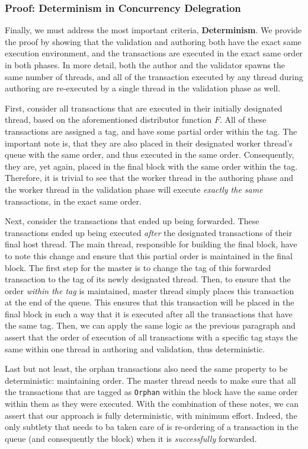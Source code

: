 \subsubsection{Proof: Determinism in Concurrency Delegration}

Finally, we must address the most important criteria, \textbf{Determinism}. We provide the proof by
showing that the validation and authoring both have the exact same execution environment, and the
transactions are executed in the exact same order in both phases. In more detail, both the author
and the validator spawns the same number of threads, and all of the transaction executed by any
thread during authoring are re-executed by a single thread in the validation phase as well.

First, consider all transactions that are executed in their initially designated thread, based on
the aforementioned distributor function $F$. All of these transactions are assigned a tag, and have
some partial order within the tag. The important note is, that they are also placed in their
designated worker thread's queue with the same order, and thus executed in the same order.
Consequently, they are, yet again, placed in the final block with the same order within the tag.
Therefore, it is trivial to see that the worker thread in the authoring phase and the worker thread
in the validation phase will execute \textit{exactly the same} transactions, in the exact same
order.

Next, consider the transactions that ended up being forwarded. These transactions ended up being
executed \textit{after} the designated transactions of their final host thread. The main thread,
responsible for building the final block, have to note this change and ensure that this partial
order is maintained in the final block. The first step for the master is to change the tag of this
forwarded transaction to the tag of its newly designated thread. Then, to ensure that the order
\textit{within the tag} is maintained, master thread simply places this transaction at the end
of the queue. This ensures that this transaction will be placed in the final block in such a way
that it is executed after all the transactions that have the same tag. Then, we can apply the same
logic as the previous paragraph and assert that the order of execution of all transactions with a
specific tag stays the same within one thread in authoring and validation, thus deterministic.

Last but not least, the orphan transactions also need the same property to be deterministic:
maintaining order. The master thread needs to make sure that all the transactions that are tagged as
\texttt{Orphan} within the block have the same order within them as they were executed. With the
combination of these notes, we can assert that our approach is fully deterministic, with minimum
effort. Indeed, the only subtlety that needs to ba taken care of is re-ordering of a transaction in
the queue (and consequently the block) when it is \textit{successfully} forwarded.


